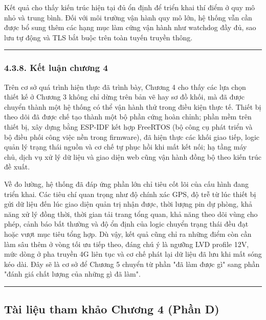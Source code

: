 \documentclass[a4paper]{extarticle}
\begin{document}
Kết quả cho thấy kiến trúc hiện tại đủ ổn định để triển khai thí điểm ở
quy mô nhỏ và trung bình. Đối với môi trường vận hành quy mô lớn, hệ
thống vẫn cần được bổ sung thêm các hạng mục làm cứng vận hành như
watchdog đầy đủ, sao lưu tự động và TLS bắt buộc trên toàn tuyến truyền thông.

\begin{center}\rule{0.5\linewidth}{0.5pt}\end{center}

\subsubsection{4.3.8. Kết luận chương
4}\label{438-kux1ebft-luux1eadn-chux1b0ux1a1ng-4}

Trên cơ sở quá trình hiện thực đã trình bày, Chương 4 cho thấy các lựa
chọn thiết kế ở Chương 3 không chỉ dừng trên bản vẽ hay sơ đồ khối, mà
đã được chuyển thành một hệ thống có thể vận hành thử trong điều kiện
thực tế. Thiết bị theo dõi đã được chế tạo thành một bộ phần cứng hoàn
chỉnh; phần mềm trên thiết bị, xây dựng bằng ESP-IDF kết hợp FreeRTOS
(bộ công cụ phát triển và bộ điều phối công việc nền trong firmware), đã
hiện thực các khối giao tiếp, logic quản lý trạng thái nguồn và cơ chế
tự phục hồi khi mất kết nối; hạ tầng máy chủ, dịch vụ xử lý dữ liệu và
giao diện web cũng vận hành đồng bộ theo kiến trúc đề xuất.

Về đo lường, hệ thống đã đáp ứng phần lớn chỉ tiêu cốt lõi của cấu hình
đang triển khai. Các tiêu chí quan trọng như độ chính xác GPS, độ trễ
từ lúc thiết bị gửi dữ liệu đến lúc giao diện quản trị nhận được, thời lượng pin
dự phòng, khả năng xử lý đồng thời, thời gian tải trang tổng quan, khả năng
theo dõi vùng cho phép, cảnh báo bất thường và độ ổn định của
logic chuyển trạng thái đều đạt hoặc vượt mục tiêu tổng hợp. Dù vậy, kết
quả cũng chỉ ra những điểm còn cần làm sâu thêm ở vòng tối ưu tiếp theo,
đáng chú ý là ngưỡng LVD profile 12V, mức dòng ở pha truyền 4G liên tục
và cơ chế phát lại dữ liệu đã lưu khi mất sóng kéo dài. Đây sẽ là cơ sở
để Chương 5 chuyển từ phần "đã làm được gì" sang phần "đánh giá chất
lượng của những gì đã làm".

\begin{center}\rule{0.5\linewidth}{0.5pt}\end{center}

\subsection{Tài liệu tham khảo Chương 4 (Phần
D)}\label{tuxe0i-liux1ec7u-tham-khux1ea3o-chux1b0ux1a1ng-4-phux1ea7n-d}
\end{document}
